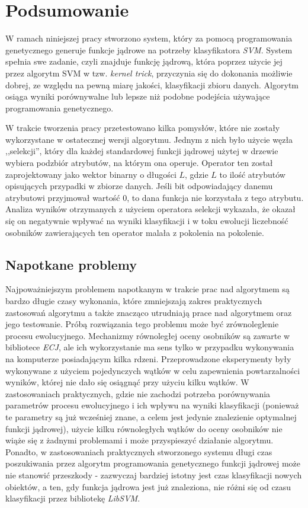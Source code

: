 \chapter{Podsumowanie}
W ramach niniejszej pracy stworzono system, który za pomocą programowania genetycznego generuje funkcje jądrowe na potrzeby klasyfikatora \emph{SVM}. System spełnia swe zadanie, czyli znajduje funkcję jądrową, która poprzez użycie jej przez algorytm SVM w tzw. \emph{kernel trick}, przyczynia się do dokonania możliwie dobrej, ze względu na pewną miarę jakości, klasyfikacji zbioru danych.
Algorytm osiąga wyniki porównywalne lub lepsze niż podobne podejścia używające programowania genetycznego.

W trakcie tworzenia pracy przetestowano kilka pomysłów, które nie zostały wykorzystane w ostatecznej wersji algorytmu. Jednym z nich było użycie węzła ,,selekcji'', który dla każdej standardowej funkcji jądrowej użytej w drzewie wybiera podzbiór atrybutów, na którym ona operuje. Operator ten został zaprojektowany jako wektor binarny o długości $ L $, gdzie $ L $ to ilość atrybutów opisujących przypadki w zbiorze danych. Jeśli bit odpowiadający danemu atrybutowi przyjmował wartość 0, to dana funkcja nie korzystała z tego atrybutu. Analiza wyników otrzymanych z użyciem operatora selekcji wykazała, że okazał się on negatywnie wpływać na wyniki klasyfikacji i w toku ewolucji liczebność osobników zawierających ten operator malała z pokolenia na pokolenie.


\section{Napotkane problemy}
Najpoważniejszym problemem napotkanym w trakcie prac nad algorytmem są bardzo długie czasy wykonania, które zmniejszają zakres praktycznych zastosowań algorytmu a także znacząco utrudniają prace nad algorytmem oraz jego testowanie.
Próbą rozwiązania tego problemu może być zrównoleglenie procesu ewolucyjnego. Mechanizmy równoległej oceny osobników są zawarte w bibliotece \emph{ECJ}, ale ich wykorzystanie ma sens tylko w przypadku wykonywania na komputerze posiadającym kilka rdzeni. Przeprowadzone eksperymenty były wykonywane z użyciem pojedynczych wątków w celu zapewnienia powtarzalności wyników, której nie dało się osiągnąć przy użyciu kilku wątków. W zastosowaniach praktycznych, gdzie nie zachodzi potrzeba porównywania parametrów procesu ewolucyjnego i ich wpływu na wyniki klasyfikacji (ponieważ te parametry są już wcześniej znane, a celem jest jedynie znalezienie optymalnej funkcji jądrowej), użycie kilku równoległych wątków do oceny osobników nie wiąże się z żadnymi problemami i może przyspieszyć działanie algorytmu.
Ponadto, w zastosowaniach praktycznych stworzonego systemu długi czas poszukiwania przez algorytm programowania genetycznego funkcji jądrowej może nie stanowić przeszkody - zazwyczaj bardziej istotny jest czas klasyfikacji nowych obiektów, a ten, gdy funkcja jądrowa jest już znaleziona, nie różni się od czasu klasyfikacji przez bibliotekę \emph{LibSVM}.

